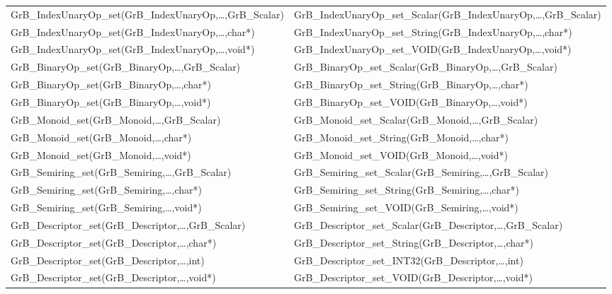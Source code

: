 \begin{table}[htb]
{\begin{tabular}{l|l}
{\sf GrB\_IndexUnaryOp\_set(GrB\_IndexUnaryOp,\ldots,GrB\_Scalar)}  & {\sf GrB\_IndexUnaryOp\_set\_Scalar(GrB\_IndexUnaryOp,\ldots,GrB\_Scalar)} \\
{\sf GrB\_IndexUnaryOp\_set(GrB\_IndexUnaryOp,\ldots,char*)}        & {\sf GrB\_IndexUnaryOp\_set\_String(GrB\_IndexUnaryOp,\ldots,char*)} \\
{\sf GrB\_IndexUnaryOp\_set(GrB\_IndexUnaryOp,\ldots,void*)}        & {\sf GrB\_IndexUnaryOp\_set\_VOID(GrB\_IndexUnaryOp,\ldots,void*)} \\
\hline

{\sf GrB\_BinaryOp\_set(GrB\_BinaryOp,\ldots,GrB\_Scalar)}  & {\sf GrB\_BinaryOp\_set\_Scalar(GrB\_BinaryOp,\ldots,GrB\_Scalar)} \\
{\sf GrB\_BinaryOp\_set(GrB\_BinaryOp,\ldots,char*)}        & {\sf GrB\_BinaryOp\_set\_String(GrB\_BinaryOp,\ldots,char*)} \\
{\sf GrB\_BinaryOp\_set(GrB\_BinaryOp,\ldots,void*)}        & {\sf GrB\_BinaryOp\_set\_VOID(GrB\_BinaryOp,\ldots,void*)} \\
\hline

{\sf GrB\_Monoid\_set(GrB\_Monoid,\ldots,GrB\_Scalar)}  & {\sf GrB\_Monoid\_set\_Scalar(GrB\_Monoid,\ldots,GrB\_Scalar)} \\
{\sf GrB\_Monoid\_set(GrB\_Monoid,\ldots,char*)}        & {\sf GrB\_Monoid\_set\_String(GrB\_Monoid,\ldots,char*)} \\
{\sf GrB\_Monoid\_set(GrB\_Monoid,\ldots,void*)}        & {\sf GrB\_Monoid\_set\_VOID(GrB\_Monoid,\ldots,void*)} \\
\hline

{\sf GrB\_Semiring\_set(GrB\_Semiring,\ldots,GrB\_Scalar)}  & {\sf GrB\_Semiring\_set\_Scalar(GrB\_Semiring,\ldots,GrB\_Scalar)} \\
{\sf GrB\_Semiring\_set(GrB\_Semiring,\ldots,char*)}        & {\sf GrB\_Semiring\_set\_String(GrB\_Semiring,\ldots,char*)} \\
{\sf GrB\_Semiring\_set(GrB\_Semiring,\ldots,void*)}        & {\sf GrB\_Semiring\_set\_VOID(GrB\_Semiring,\ldots,void*)} \\
\hline

{\sf GrB\_Descriptor\_set(GrB\_Descriptor,\ldots,GrB\_Scalar)}  & {\sf GrB\_Descriptor\_set\_Scalar(GrB\_Descriptor,\ldots,GrB\_Scalar)} \\
{\sf GrB\_Descriptor\_set(GrB\_Descriptor,\ldots,char*)}        & {\sf GrB\_Descriptor\_set\_String(GrB\_Descriptor,\ldots,char*)} \\
{\sf GrB\_Descriptor\_set(GrB\_Descriptor,\ldots,int)}        & {\sf GrB\_Descriptor\_set\_INT32(GrB\_Descriptor,\ldots,int)} \\
{\sf GrB\_Descriptor\_set(GrB\_Descriptor,\ldots,void*)}        & {\sf GrB\_Descriptor\_set\_VOID(GrB\_Descriptor,\ldots,void*)} \\
\hline


\end{tabular}}
\end{table}

